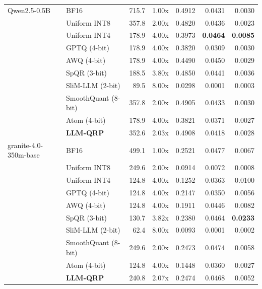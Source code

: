 \begin{table}[htbp]
\begin{tabular}{l lrrrrr}
    \midrule
    Qwen2.5-0.5B & BF16 & 715.7 & 1.00x & 0.4912 & 0.0431 & 0.0030 \\
     & Uniform INT8 & 357.8 & 2.00x & 0.4820 & 0.0436 & 0.0023 \\
     & Uniform INT4 & 178.9 & 4.00x & 0.3973 & \textbf{0.0464} & \textbf{0.0085} \\
     & GPTQ (4-bit) & 178.9 & 4.00x & 0.3820 & 0.0309 & 0.0030 \\
     & AWQ (4-bit) & 178.9 & 4.00x & 0.4490 & 0.0450 & 0.0029 \\
     & SpQR (3-bit) & 188.5 & 3.80x & 0.4850 & 0.0441 & 0.0036 \\
     & SliM-LLM (2-bit) & 89.5 & 8.00x & 0.0298 & 0.0001 & 0.0003 \\
     & SmoothQuant (8-bit) & 357.8 & 2.00x & 0.4905 & 0.0433 & 0.0030 \\
     & Atom (4-bit) & 178.9 & 4.00x & 0.3821 & 0.0371 & 0.0027 \\
     & \textbf{LLM-QRP} & 352.6 & 2.03x & 0.4908 & 0.0418 & 0.0028 \\
    \midrule
    granite-4.0-350m-base & BF16 & 499.1 & 1.00x & 0.2521 & 0.0477 & 0.0067 \\
     & Uniform INT8 & 249.6 & 2.00x & 0.0914 & 0.0072 & 0.0008 \\
     & Uniform INT4 & 124.8 & 4.00x & 0.1252 & 0.0363 & 0.0100 \\
     & GPTQ (4-bit) & 124.8 & 4.00x & 0.2147 & 0.0350 & 0.0056 \\
     & AWQ (4-bit) & 124.8 & 4.00x & 0.1911 & 0.0446 & 0.0082 \\
     & SpQR (3-bit) & 130.7 & 3.82x & 0.2380 & 0.0464 & \textbf{0.0233} \\
     & SliM-LLM (2-bit) & 62.4 & 8.00x & 0.0093 & 0.0001 & 0.0002 \\
     & SmoothQuant (8-bit) & 249.6 & 2.00x & 0.2473 & 0.0474 & 0.0058 \\
     & Atom (4-bit) & 124.8 & 4.00x & 0.1448 & 0.0360 & 0.0027 \\
     & \textbf{LLM-QRP} & 240.8 & 2.07x & 0.2474 & 0.0468 & 0.0052 \\
    \bottomrule
  \end{tabular}
\end{table}
